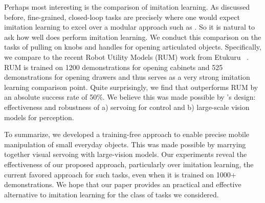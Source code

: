 Perhaps most interesting is the comparison of \name \vs imitation learning. 
As discussed before, fine-grained, closed-loop tasks are precisely where one
would expect imitation learning to excel over a modular approach such as \name.
So it is natural to ask how well does \name perform \vs imitation learning. We
conduct this comparison on the tasks of pulling on knobs and handles for opening
articulated objects. Specifically, we compare to the recent Robot Utility Models
(RUM) work from Etukuru \etal~\cite{etukuru2024robot}. RUM is trained on 1200
demonstrations for opening cabinets and 525 demonstrations for opening drawers
and thus serves as a very strong imitation learning comparison point. Quite
surprisingly, we find that \name outperforms RUM by an absolute success rate of
50\%. We believe this was made possible by \name's design: effectiveness and
robustness of a) servoing for control and b) large-scale vision models for perception.



To summarize, we developed \name a training-free approach to enable precise
mobile manipulation of small everyday objects. This was made possible by
marrying together visual servoing with large-vision models. Our experiments
reveal the effectiveness of our proposed approach, particularly over imitation
learning, the current favored approach for such tasks, even when it is trained
on 1000+ demonstrations. We hope that our paper provides an practical and
effective alternative to imitation learning for the class of tasks we
considered.

